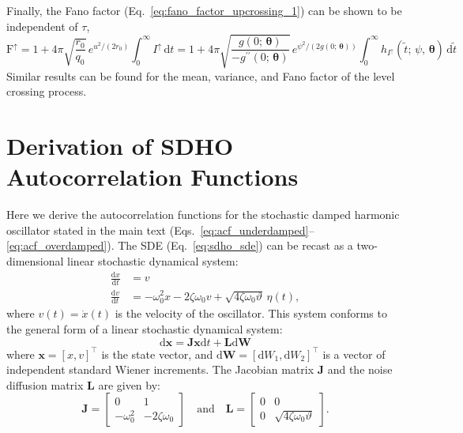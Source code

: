 \documentclass[journal]{IEEEtran}
\theoremstyle{plain}
\theoremstyle{definition}
\theoremstyle{remark}
\newcommand{\FFup}{\mathrm{F}^\uparrow}
\newcommand{\Iup}{I^\uparrow}
\newcommand{\btheta}{\boldsymbol{\theta}}
\newcommand{\dd}{\mathrm{d}}
\newcommand{\temp}{\vartheta}
\begin{document}
Finally, the Fano factor (Eq.~\eqref{eq:fano_factor_upcrossing_1}) can be shown to be independent of $\tau$,
\begin{equation}
    \FFup = 1 + 4 \pi \sqrt{\frac{r_0}{q_0}} \,e^{u^2/(2r_0)} \int_{0}^\infty \Iup \, \dd t = 1 + 4 \pi \sqrt{\frac{g\left(0;\,\btheta\right)}{-g^{\prime\prime}\left(0;\,\btheta\right)}} \, e^{\psi^2/(2g\left(0;\,\btheta\right))} \int_{0}^\infty h_{\Iup}\left(\tilde{t};\, \psi, \, \btheta\right)  \, \dd \tilde{t}
\end{equation}
Similar results can be found for the mean, variance, and Fano factor of the level crossing process.


\section{Derivation of SDHO Autocorrelation Functions}
\label{section:sdho_derivation}
Here we derive the autocorrelation functions for the stochastic damped harmonic oscillator stated in the main text (Eqs.~\eqref{eq:acf_underdamped}--\eqref{eq:acf_overdamped}). The SDE (Eq.~\eqref{eq:sdho_sde}) can be recast as a two-dimensional linear stochastic dynamical system:
\begin{equation}
\begin{split}
    \frac{\dd x}{\dd t} &= v \\
    \frac{\dd v}{\dd t} &= -\omega_0^2 x - 2 \zeta \omega_0 v + \sqrt{4 \zeta \omega_0 \temp} \, \eta(t),
\end{split}
\label{eq:sdho_sde_2d}
\end{equation}
where \( v(t) = \dot{x}(t) \) is the velocity of the oscillator.
This system conforms to the general form of a linear stochastic dynamical system:
\begin{equation}
    \dd\mathbf{x} = \mathbf{J} \mathbf{x} \dd t + \mathbf{L} \dd\mathbf{W}
\end{equation}
where $\mathbf{x} = [x, v]^\top$ is the state vector, and $\dd\mathbf{W}=[\dd W_1, \dd W_2]^\top$ is a vector of independent standard Wiener increments. The Jacobian matrix $\mathbf{J}$ and the noise diffusion matrix $\mathbf{L}$ are given by:
\begin{equation}
\renewcommand{\arraystretch}{1.0}
    \mathbf{J} = \begin{bmatrix}
        0 & 1 \\
        -\omega_0^2 & -2 \zeta \omega_0
    \end{bmatrix} \quad \text{and} \quad
    \mathbf{L} = \begin{bmatrix}
        0 & 0 \\
        0 &\sqrt{4 \zeta \omega_0 \temp}
    \end{bmatrix}.
\label{eq:sdho_matrices}
\end{equation}
\end{document}
